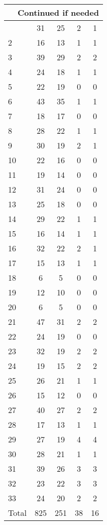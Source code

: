 \begin{center}
\begin{longtable}{l|c|c|c|c}
\hline \multicolumn{5}{|r|}{{Continued if needed}} \\ \hline
\endfoot 
1 & 31 & 25 & 2 & 1\\ \hline
2 & 16 & 13 & 1 & 1\\ \hline
3 & 39 & 29 & 2 & 2\\ \hline
4 & 24 & 18 & 1 & 1\\ \hline
5 & 22 & 19 & 0 & 0\\ \hline
6 & 43 & 35 & 1 & 1\\ \hline
7 & 18 & 17 & 0 & 0\\ \hline
8 & 28 & 22 & 1 & 1\\ \hline
9 & 30 & 19 & 2 & 1\\ \hline
10 & 22 & 16 & 0 & 0\\ \hline
11 & 19 & 14 & 0 & 0\\ \hline
12 & 31 & 24 & 0 & 0\\ \hline
13 & 25 & 18 & 0 & 0\\ \hline
14 & 29 & 22 & 1 & 1\\ \hline
15 & 16 & 14 & 1 & 1\\ \hline
16 & 32 & 22 & 2 & 1\\ \hline
17 & 15 & 13 & 1 & 1\\ \hline
18 & 6 & 5 & 0 & 0\\ \hline
19 & 12 & 10 & 0 & 0\\ \hline
20 & 6 & 5 & 0 & 0\\ \hline
21 & 47 & 31 & 2 & 2\\ \hline
22 & 24 & 19 & 0 & 0\\ \hline
23 & 32 & 19 & 2 & 2\\ \hline
24 & 19 & 15 & 2 & 2\\ \hline
25 & 26 & 21 & 1 & 1\\ \hline
26 & 15 & 12 & 0 & 0\\ \hline
27 & 40 & 27 & 2 & 2\\ \hline
28 & 17 & 13 & 1 & 1\\ \hline
29 & 27 & 19 & 4 & 4\\ \hline
30 & 28 & 21 & 1 & 1\\ \hline
31 & 39 & 26 & 3 & 3\\ \hline
32 & 23 & 22 & 3 & 3\\ \hline
33 & 24 & 20 & 2 & 2\\ \hline
Total & 825 & 251 & 38 & 16
\end{longtable}
\end{center}



